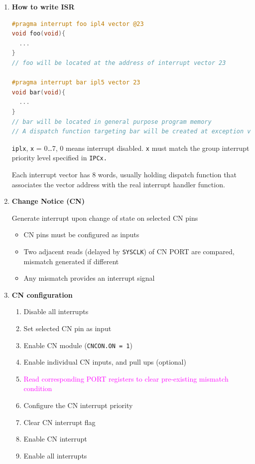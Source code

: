 \documentclass[a4paper]{article}
\begin{document}
\begin{enumerate}[label = \arabic*.]
    \item \textbf{How to write ISR}
      \begin{lstlisting}[language = c]
#pragma interrupt foo ipl4 vector @23
void foo(void){
  ...
}
// foo will be located at the address of interrupt vector 23

#pragma interrupt bar ipl5 vector 23
void bar(void){
  ...
}
// bar will be located in general purpose program memory
// A dispatch function targeting bar will be created at exception vector address 23
    \end{lstlisting}
      \par \verb|iplx|, \verb|x| = 0\ldots 7, 0 means interrupt disabled. \verb|x| must match the group interrupt priority level specified in \verb|IPCx.|
      \par Each interrupt vector has 8 words, usually holding dispatch function that associates the vector address with the real interrupt handler function.

    \item \textbf{Change Notice (CN)}
      \par Generate interrupt upon change of state on selected CN pins
      \begin{itemize}[leftmargin = 1cm]
        \item CN pins must be configured as inputs
        \item Two adjacent reads (delayed by \verb|SYSCLK|) of CN PORT are compared, mismatch generated if different
        \item Any mismatch provides an interrupt signal
      \end{itemize}
    \item \textbf{CN configuration}
      \begin{enumerate}[label = \arabic*.]
        \item Disable all interrupts
        \item Set selected CN pin as input
        \item Enable CN module (\verb|CNCON.ON = 1|)
        \item Enable individual CN inputs, and pull ups (optional)
        \item \textcolor{magenta}{Read corresponding PORT registers to clear pre-existing mismatch condition}
        \item Configure the CN interrupt priority
        \item Clear CN interrupt flag
        \item Enable CN interrupt
        \item Enable all interrupts
      \end{enumerate}


\end{enumerate}
\end{document}
